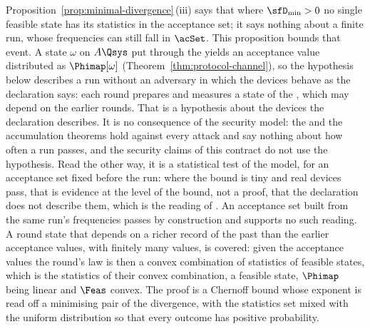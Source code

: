 Proposition~\ref{prop:minimal-divergence}\,(iii) says that where
$\sfD_{\min}>0$ no single feasible state has its statistics in the acceptance
set; it says nothing about a finite run, whose frequencies can still fall in
$\acSet$. This proposition bounds that event. A state $\omega$ on $A\Qsys$
put through the  yields an acceptance value
distributed as $\Phimap[\omega]$ (Theorem~\ref{thm:protocol-channel}), so the
hypothesis below describes a run without an adversary in which the devices
behave as the declaration says: each round prepares and measures a state of
the , which may depend on the earlier rounds. That is a
hypothesis about the devices the declaration describes. It is no consequence of the
security model: the  and the accumulation theorems hold
against every attack and say nothing about how often a run passes, and the
security claims of this contract do not use the hypothesis. Read the other way, it is a statistical test of the model, for an
acceptance set fixed before the run: where the bound is tiny and real
devices pass, that is evidence at the level of the bound, not a proof, that the
declaration does not describe them, which is the reading of
. An acceptance set built from the same run's
frequencies passes by construction and supports no such reading. A round state that depends on a
richer record of the past than the earlier acceptance values, with finitely
many values, is covered: given the acceptance values the round's law is then
a convex combination of statistics of feasible states, which is the
statistics of their convex combination, a feasible state, $\Phimap$ being
linear and $\Feas$ convex. The proof is a Chernoff bound whose exponent is
read off a minimising pair of the divergence, with the statistics set mixed
with the uniform distribution so that every outcome has positive probability.

